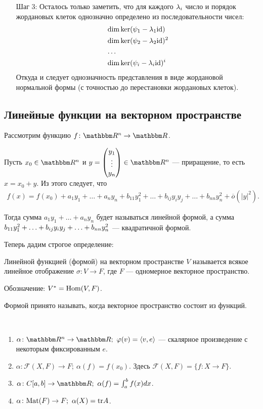 \begin{itemize}
\item[Шаг 3:] Осталось только заметить, что для каждого $\lambda_i$ число и порядок жордановых клеток однозначно определено из последовательности чисел:
\begin{align*}
&\dim \ker (\psi_1 - \lambda_1 \mathrm{id}) \\
&\dim \ker (\psi_2 - \lambda_2 \mathrm{id}) ^ 2 \\
&\ldots \\
&\dim \ker (\psi_i - \lambda_i \mathrm{id})^i
\end{align*}
Откуда и следует однозначность представления в виде жордановой нормальной формы (с точностью до перестановки жордановых клеток).
\end{itemize}

\subsection*{Линейные функции на векторном пространстве}
Рассмотрим функцию $f \colon \R^n \rightarrow \R$.

Пусть $x_0 \in \R^n$ и $y = \begin{pmatrix}y_1 \\ \vdots \\ y_n\end{pmatrix} \in\R^n$ --- приращение, то есть $x = x_0 + y$. Из этого следует, что
\begin{gather*}
f(x) = f(x_0) + a_1y_1 + \ldots + a_ny_n + b_{11}y_1^2 + \ldots + b_{ij}y_iy_j +\ldots + b_{nn}y_n^2 + \overline{o}(|y|^2).
\end{gather*}

Тогда сумма $a_1y_1 + \ldots + a_ny_n$ будет называться линейной формой, а сумма $b_{11}y_1^2 + \ldots \hm+ b_{ij}y_iy_j + \ldots + b_{nn}y_n^2$ --- квадратичной формой.

Теперь дадим строгое определение:
\begin{Def}
Линейной функцией (формой) на векторном пространстве $V$ называется всякое линейное отображение $\sigma \colon V \rightarrow F$, где $F$ --- одномерное векторное пространство. 

Обозначение: $V^* = \mathrm{Hom}(V, F)$.
\end{Def}

\begin{Comment}
Формой принято называть, когда векторное пространство состоит из функций.
\end{Comment}

\begin{Examples}\
\begin{enumerate}
\item $\alpha \colon \R^n \rightarrow \R;\ \phi(v) = \langle v, e \rangle$ --- скалярное произведение с некоторым фиксированным $e$.
\item $\alpha \colon \mathcal{F}(X, F) \rightarrow F;\ \alpha(f) = f(x_0)$. Здесь $\mathcal{F}(X, F) = \{f \colon X \rightarrow F  \}$.
\item $\alpha \colon C[a, b] \rightarrow \R;\ \alpha(f) = \int_a^b f(x) dx$.
\item $\alpha \colon \Mat(F) \rightarrow F;\ \alpha(X) = \mathrm{tr}A$.
\end{enumerate}
\end{Examples}

